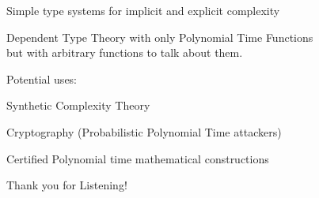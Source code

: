 \documentclass[xetex,serif,mathserif,aspectratio=169]{beamer}
\begin{document}
\begin{frame}


  \point Simple type systems for implicit and explicit complexity\\

  \bigskip

  \point Dependent Type Theory with only Polynomial Time Functions\\
  \qquad \textcolor{black!60}{but with arbitrary functions to talk about them.}


  \bigskip

  \point Potential uses: \\

  \medskip

  \qquad \point Synthetic Complexity Theory \\

  \medskip

  \qquad \point Cryptography (Probabilistic Polynomial Time attackers) \\

  \medskip

  \qquad \point Certified Polynomial time mathematical constructions

  \pause

  \begin{center}
    \Huge Thank you for Listening!
  \end{center}

\end{frame}
\end{document}
